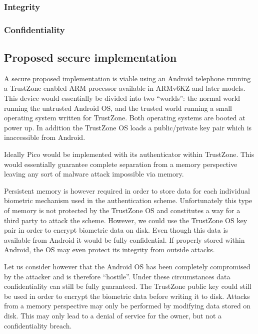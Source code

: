 	\subsubsection*{Integrity}
	\subsubsection*{Confidentiality}

\subsection{Proposed secure implementation}

A secure proposed implementation is viable using an Android telephone running a TrustZone enabled ARM processor available in ARMv6KZ \cite{} and later models. This device would essentially be divided into two ``worlds'': the normal world running the untrusted Android OS, and the trusted world running a small operating system written for TrustZone. Both operating systems are booted at power up. In addition the TrustZone OS loads a public/private key pair which is inaccessible from Android.  

Ideally Pico would be implemented with its authenticator within TrustZone. This would essentially guarantee complete separation from a memory perspective leaving any sort of malware attack impossible via memory. 

Persistent memory is however required in order to store data for each individual biometric mechanism used in the authentication scheme. Unfortunately this type of memory is not protected by the TrustZone OS and constitutes a way for a third party to attack the scheme. However, we could use the TrustZone OS key pair in order to encrypt biometric data on disk. Even though this data is available from Android it would be fully confidential. If properly stored within Android, the OS may even protect its integrity from outside attacks.

Let us consider however that the Android OS has been completely compromised by the attacker and is therefore ``hostile''. Under these circumstances data confidentiality can still be fully guaranteed. The TrustZone public key could still be used in order to encrypt the biometric data before writing it to disk. Attacks from a memory perspective may only be performed by modifying data stored on disk. This may only lead to a denial of service for the owner, but not a confidentiality breach.

